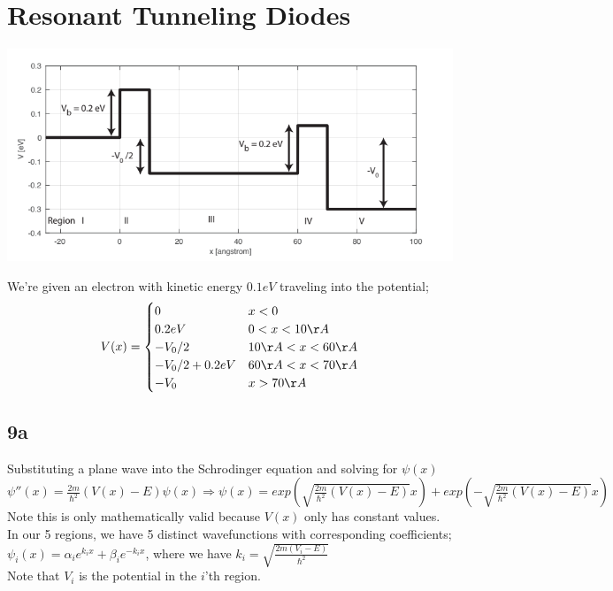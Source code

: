 \documentclass{article}
\begin{document}
\section*{Resonant Tunneling Diodes}
\includegraphics[width=\textwidth]{9.png}

We're given an electron with kinetic energy $0.1eV$ traveling into the potential;\\

\[
  V(x) =
  \begin{cases}
    0  & x<0 \\
    0.2eV & 0<x<10\AA\\
    -V_0/2 & 10\AA<x<60\AA\\
    -V_0/2+0.2eV & 60\AA<x<70\AA\\
    -V_0 & x>70\AA
  \end{cases}
\]
\subsection*{9a}
Substituting a plane wave into the Schrodinger equation and solving for $\psi(x)$\\

$\psi''(x)=\frac{2m}{\hbar^2}(V(x)-E)\psi(x)\Longrightarrow\psi(x)=exp(\sqrt{\frac{2m}{\hbar^2}(V(x)-E)}x)+exp(-\sqrt{\frac{2m}{\hbar^2}(V(x)-E)}x)$\\

Note this is only mathematically valid because $V(x)$ only has constant values.\\

In our 5 regions, we have 5 distinct wavefunctions with corresponding coefficients;\\

$\psi_i(x)=\alpha_ie^{k_ix}+\beta_ie^{-k_ix}$, where we have $k_i=\sqrt{\frac{2m(V_i-E)}{\hbar^2}}$\\

Note that $V_i$ is the potential in the $i$'th region.\\
\end{document}
